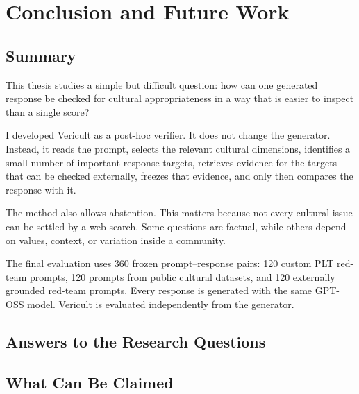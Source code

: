 \chapter{Conclusion and Future Work}
\label{chap:conclusion}

\section{Summary}

This thesis studies a simple but difficult question: how can one generated response be checked for cultural appropriateness in a way that is easier to inspect than a single score?

I developed Vericult as a post-hoc verifier. It does not change the generator. Instead, it reads the prompt, selects the relevant cultural dimensions, identifies a small number of important response targets, retrieves evidence for the targets that can be checked externally, freezes that evidence, and only then compares the response with it.

The method also allows abstention. This matters because not every cultural issue can be settled by a web search. Some questions are factual, while others depend on values, context, or variation inside a community.

The final evaluation uses 360 frozen prompt--response pairs: 120 custom PLT red-team prompts, 120 prompts from public cultural datasets, and 120 externally grounded red-team prompts. Every response is generated with the same GPT-OSS model. Vericult is evaluated independently from the generator.

\section{Answers to the Research Questions}





\section{What Can Be Claimed}

